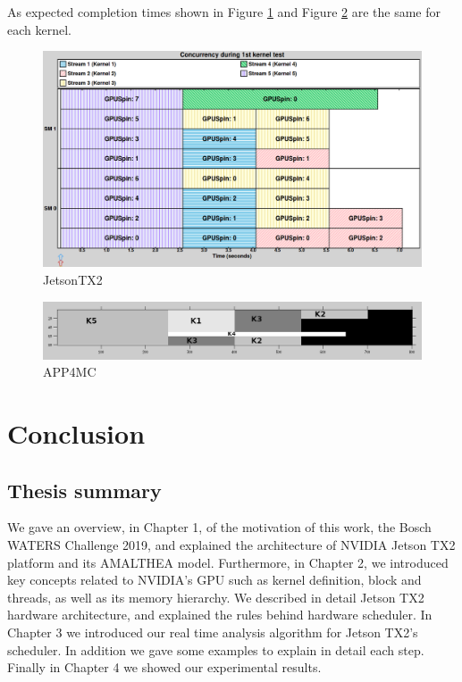 \documentclass[
  12pt,
  a4paperpaper,
]{report}
\begin{document}
As expected completion times shown in Figure \ref{img:nvidia-ex07} and
Figure \ref{img:octave-ex07} are the same for each kernel.

\begin{figure}
\centering
\includegraphics[width=1\textwidth,height=\textheight]{source/figures/nvidia/ex07.png}
\caption{JetsonTX2 \label{img:nvidia-ex07}}
\end{figure}

\begin{figure}
\centering
\includegraphics[width=1\textwidth,height=\textheight]{source/figures/octave/ex07.png}
\caption{APP4MC \label{img:octave-ex07}}
\end{figure}

\hypertarget{conclusion}{%
\chapter{Conclusion}\label{conclusion}}

\hypertarget{thesis-summary}{%
\section{Thesis summary}\label{thesis-summary}}

We gave an overview, in Chapter 1, of the motivation of this work, the
Bosch WATERS Challenge 2019, and explained the architecture of NVIDIA Jetson
TX2 platform and its AMALTHEA model. Furthermore, in Chapter 2, we
introduced key concepts related to NVIDIA's GPU such as kernel
definition, block and threads, as well as its memory hierarchy. We
described in detail Jetson TX2 hardware architecture, and explained the
rules behind hardware scheduler. In Chapter 3 we introduced our real
time analysis algorithm for Jetson TX2's scheduler. In addition we gave
some examples to explain in detail each step. Finally in Chapter 4 we
showed our experimental results.
\end{document}
